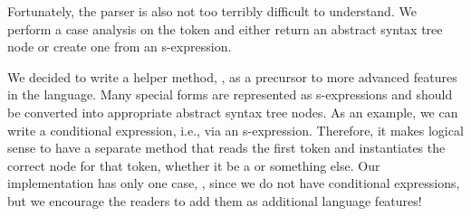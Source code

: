 Fortunately, the parser is also not too terribly difficult to understand. 
We perform a case analysis on the token and either return an abstract syntax tree node or create one from an s-expression.

We decided to write a helper method, , as a precursor to more advanced features in the language. 
Many special forms are represented as s-expressions and should be converted into appropriate abstract syntax tree nodes. 
As an example, we can write a conditional expression, i.e.,  via an s-expression. 
Therefore, it makes logical sense to have a separate method that reads the first token and instantiates the correct node for that token, whether it be a  or something else. 
Our implementation has only one case, , since we do not have conditional expressions, but we encourage the readers to add them as additional language features!

